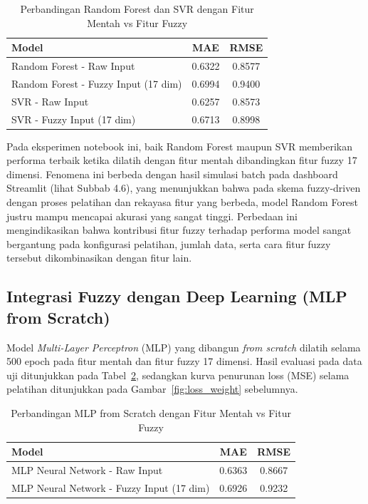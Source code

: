 \documentclass[11pt,a4paper]{article}
\begin{document}
\begin{table}[H]
\centering
\caption{Perbandingan Random Forest dan SVR dengan Fitur Mentah vs Fitur Fuzzy}
\label{tab:ml}
\begin{tabular}{lcc}
\toprule
\textbf{Model} & \textbf{MAE} & \textbf{RMSE} \\
\midrule
Random Forest - Raw Input & 0.6322 & 0.8577 \\
Random Forest - Fuzzy Input (17 dim) & 0.6994 & 0.9400 \\
SVR - Raw Input & 0.6257 & 0.8573 \\
SVR - Fuzzy Input (17 dim) & 0.6713 & 0.8998 \\
\bottomrule
\end{tabular}
\end{table}

Pada eksperimen notebook ini, baik Random Forest maupun SVR memberikan performa terbaik ketika dilatih dengan fitur mentah dibandingkan fitur fuzzy 17 dimensi. Fenomena ini berbeda dengan hasil simulasi batch pada dashboard Streamlit (lihat Subbab 4.6), yang menunjukkan bahwa pada skema fuzzy-driven dengan proses pelatihan dan rekayasa fitur yang berbeda, model Random Forest justru mampu mencapai akurasi yang sangat tinggi. Perbedaan ini mengindikasikan bahwa kontribusi fitur fuzzy terhadap performa model sangat bergantung pada konfigurasi pelatihan, jumlah data, serta cara fitur fuzzy tersebut dikombinasikan dengan fitur lain.

\subsection{Integrasi Fuzzy dengan Deep Learning (MLP from Scratch)}
Model \textit{Multi-Layer Perceptron} (MLP) yang dibangun \textit{from scratch} dilatih selama 500 epoch pada fitur mentah dan fitur fuzzy 17 dimensi. Hasil evaluasi pada data uji ditunjukkan pada Tabel~\ref{tab:mlp}, sedangkan kurva penurunan loss (MSE) selama pelatihan ditunjukkan pada Gambar~\ref{fig:loss_weight} sebelumnya.

\begin{table}[H]
\centering
\caption{Perbandingan MLP from Scratch dengan Fitur Mentah vs Fitur Fuzzy}
\label{tab:mlp}
\begin{tabular}{lcc}
\toprule
\textbf{Model} & \textbf{MAE} & \textbf{RMSE} \\
\midrule
MLP Neural Network - Raw Input & 0.6363 & 0.8667 \\
MLP Neural Network - Fuzzy Input (17 dim) & 0.6926 & 0.9232 \\
\bottomrule
\end{tabular}
\end{table}
\end{document}
